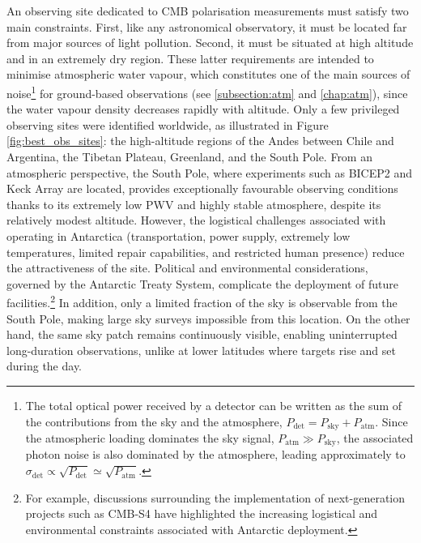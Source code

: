 \documentclass[../../thesis.tex]{subfiles}
\begin{document}
An observing site dedicated to CMB polarisation measurements must satisfy two main constraints. First, like any astronomical observatory, it must be located far from major sources of light pollution. Second, it must be situated at high altitude and in an extremely dry region. These latter requirements are intended to minimise atmospheric water vapour, which constitutes one of the main sources of noise\footnote{The total optical power received by a detector can be written as the sum of the contributions from the sky and the atmosphere, $P_{\mathrm{det}} = P_{\mathrm{sky}} + P_{\mathrm{atm}}$. Since the atmospheric loading dominates the sky signal, $P_{\mathrm{atm}} \gg P_{\mathrm{sky}}$, the associated photon noise is also dominated by the atmosphere, leading approximately to $\sigma_{\mathrm{det}} \propto \sqrt{P_{\mathrm{det}}} \simeq \sqrt{P_{\mathrm{atm}}}$.} for ground-based observations (see \ref{subsection:atm} and \ref{chap:atm}), since the water vapour density decreases rapidly with altitude. Only a few privileged observing sites were identified worldwide, as illustrated in Figure \ref{fig:best_obs_sites}: the high-altitude regions of the Andes between Chile and Argentina, the Tibetan Plateau, Greenland, and the South Pole.
From an atmospheric perspective, the South Pole, where experiments such as BICEP2 and Keck Array are located, provides exceptionally favourable observing conditions thanks to its extremely low PWV and highly stable atmosphere, despite its relatively modest altitude. However, the logistical challenges associated with operating in Antarctica (transportation, power supply, extremely low temperatures, limited repair capabilities, and restricted human presence) reduce the attractiveness of the site. Political and environmental considerations, governed by the Antarctic Treaty System, complicate the deployment of future facilities.\footnote{For example, discussions surrounding the implementation of next-generation projects such as CMB-S4 have highlighted the increasing logistical and environmental constraints associated with Antarctic deployment.} In addition, only a limited fraction of the sky is observable from the South Pole, making large sky surveys impossible from this location. On the other hand, the same sky patch remains continuously visible, enabling uninterrupted long-duration observations, unlike at lower latitudes where targets rise and set during the day.
\end{document}
